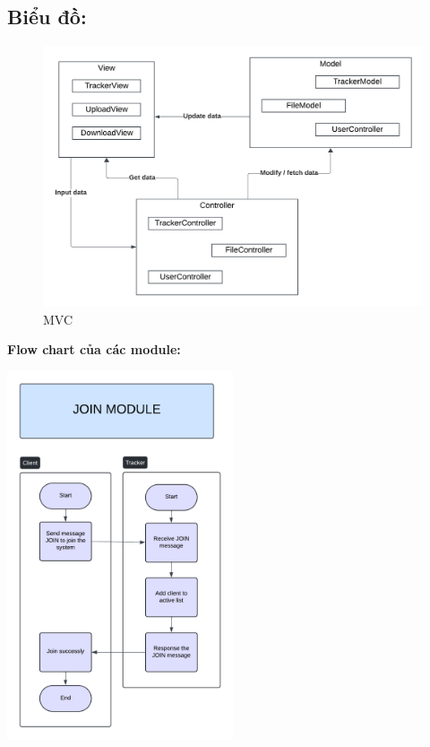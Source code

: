\documentclass[a4paper]{article}
\begin{document}
\subsection{Biểu đồ:}

\begin{figure}[H]
    \centering
    \includegraphics[width=1\textwidth]{MVC.png}
    \captionsetup{labelformat=empty}
    \caption{MVC}
    \label{fig:mvc}
\end{figure}

\textbf{Flow chart của các module:}

\includegraphics[width=0.5\textwidth]{join_module.png} 
\end{document}
